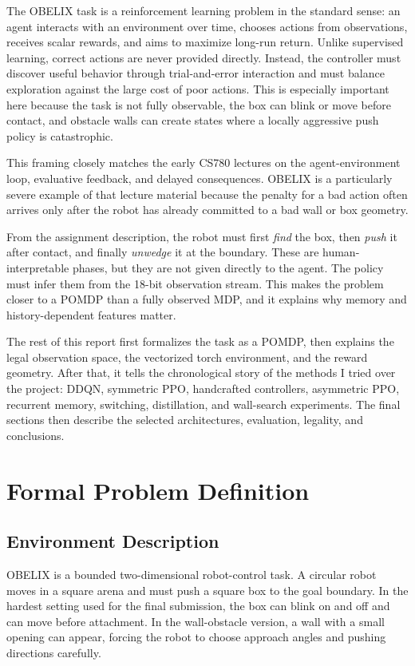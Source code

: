 \documentclass[11pt]{article}
\begin{document}
The OBELIX task is a reinforcement learning problem in the standard sense: an agent
interacts with an environment over time, chooses actions from observations, receives
scalar rewards, and aims to maximize long-run return. Unlike supervised learning,
correct actions are never provided directly. Instead, the controller must discover useful
behavior through trial-and-error interaction and must balance exploration against the
large cost of poor actions. This is especially important here because the task is not fully
observable, the box can blink or move before contact, and obstacle walls can create
states where a locally aggressive push policy is catastrophic.

This framing closely matches the early CS780 lectures on the agent-environment loop,
evaluative feedback, and delayed consequences. OBELIX is a particularly severe example
of that lecture material because the penalty for a bad action often arrives only after the
robot has already committed to a bad wall or box geometry.

From the assignment description, the robot must first \emph{find} the box, then
\emph{push} it after contact, and finally \emph{unwedge} it at the boundary. These are
human-interpretable phases, but they are not given directly to the agent. The policy
must infer them from the 18-bit observation stream. This makes the problem closer to a
POMDP than a fully observed MDP, and it explains why memory and history-dependent
features matter.

The rest of this report first formalizes the task as a POMDP, then explains the legal
observation space, the vectorized torch environment, and the reward geometry. After
that, it tells the chronological story of the methods I tried over the project: DDQN,
symmetric PPO, handcrafted controllers, asymmetric PPO, recurrent memory, switching,
distillation, and wall-search experiments. The final sections then describe the selected
architectures, evaluation, legality, and conclusions.

\section{Formal Problem Definition}

\subsection{Environment Description}

OBELIX is a bounded two-dimensional robot-control task. A circular robot moves in a
square arena and must push a square box to the goal boundary. In the hardest setting
used for the final submission, the box can blink on and off and can move before
attachment. In the wall-obstacle version, a wall with a small opening can appear,
forcing the robot to choose approach angles and pushing directions carefully.
\end{document}
